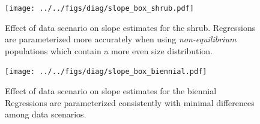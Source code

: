 \documentclass[]{article}
\begin{document}
\begin{figure}
    \centering\texttt{[image: ../../figs/diag/slope\_box\_shrub.pdf]}
    \caption{\label{fig:slopesShrub} Effect of data scenario on slope estimates for the shrub. Regressions are parameterized more accurately when using \emph{non-equilibrium} populations which contain a more even size distribution.}
\end{figure}

\begin{figure}
    \centering\texttt{[image: ../../figs/diag/slope\_box\_biennial.pdf]}
    \caption{\label{fig:slopesBiennial} Effect of data scenario on slope estimates for the biennial Regressions are parameterized consistently with minimal differences among data scenarios.}
\end{figure}
\end{document}
